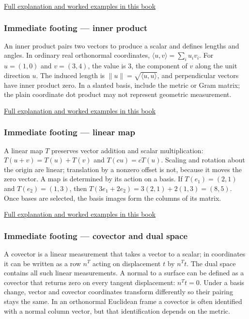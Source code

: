 \hyperref[01-foundations-i-ch018-determinant-measures-oriented-volume-and-exposes-lost-dimensions]{Full explanation and worked examples in this book}

\subsubsection{Immediate footing --- inner product}\label{01-foundations-i-ch018-immediate-footing-inner-product}

An inner product pairs two vectors to produce a scalar and defines lengths and angles. In ordinary real orthonormal coordinates, \(\langle u,v\rangle=\sum_i u_i v_i\). For \(u=(1,0)\) and \(v=(3,4)\), the value is \(3\), the component of \(v\) along the unit direction \(u\). The induced length is \(\|u\|=\sqrt{\langle u,u\rangle}\), and perpendicular vectors have inner product zero. In a slanted basis, include the metric or Gram matrix; the plain coordinate dot product may not represent geometric measurement.

\hyperref[01-foundations-i-ch017-the-dot-product-turns-two-movements-into-a-measurement]{Full explanation and worked examples in this book}

\subsubsection{Immediate footing --- linear map}\label{01-foundations-i-ch018-immediate-footing-linear-map}

A linear map \(T\) preserves vector addition and scalar multiplication: \(T(u+v)=T(u)+T(v)\) and \(T(cu)=cT(u)\). Scaling and rotation about the origin are linear; translation by a nonzero offset is not, because it moves the zero vector. A map is determined by its action on a basis. If \(T(e_1)=(2,1)\) and \(T(e_2)=(1,3)\), then \(T(3e_1+2e_2)=3(2,1)+2(1,3)=(8,5)\). Once bases are selected, the basis images form the columns of its matrix.

\hyperref[01-foundations-i-ch018-the-robot-needs-a-rule-for-moving-every-direction]{Full explanation and worked examples in this book}

\subsubsection{Immediate footing --- covector and dual space}\label{01-foundations-i-ch018-immediate-footing-covector-and-dual-space}

A covector is a linear measurement that takes a vector to a scalar; in coordinates it can be written as a row \(n^T\) acting on displacement \(t\) by \(n^Tt\). The dual space contains all such linear measurements. A normal to a surface can be defined as a covector that returns zero on every tangent displacement: \(n^Tt=0\). Under a basis change, vector and covector coordinates transform differently so their pairing stays the same. In an orthonormal Euclidean frame a covector is often identified with a normal column vector, but that identification depends on the metric.

